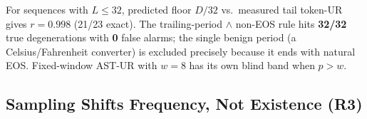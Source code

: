 \documentclass[11pt]{article}
\begin{document}
\begin{table}[t]
\centering
\caption{Repetition units and wavelengths (greedy). GPT-2 is a short-wave verbatim reprinter; Qwen a long-wave mutator.}
\label{tab:r2-units}
\end{table}

For sequences with $L\le 32$, predicted floor $D/32$ vs.\ measured tail token-UR gives $r=0.998$ (21/23 exact). The trailing-period $\land$ non-EOS rule hits \textbf{32/32} true degenerations with \textbf{0} false alarms; the single benign period (a Celsius/Fahrenheit converter) is excluded precisely because it ends with natural EOS. Fixed-window AST-UR with $w{=}8$ has its own blind band when $p > w$.

\subsection{Sampling Shifts Frequency, Not Existence (R3)}
\label{sec:r3}

\begin{table}[t]
\centering
\caption{Degeneration under sampling ($n{=}24$ per cell). Weak models shift wavelength; strong models clear within horizon.}
\label{tab:r3-shift}
\end{table}
\end{document}
